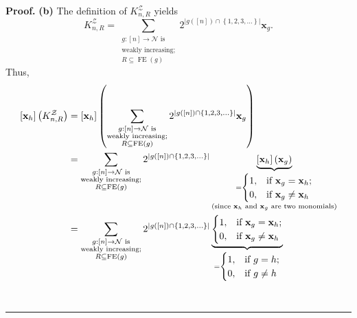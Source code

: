 \documentclass[numbers=enddot,12pt,final,onecolumn,notitlepage]{scrartcl}%
\theoremstyle{definition}
\newenvironment{proof}[1][Proof]{\noindent\textbf{#1.} }{\ \rule{0.5em}{0.5em}}
\let\sumnonlimits\sum
\renewcommand{\sum}{\sumnonlimits\limits}
\begin{document}
\begin{proof}
\textbf{(b)} The definition of $K_{n,R}^{\mathcal{Z}}$ yields%
\[
K_{n,R}^{\mathcal{Z}}=\sum_{\substack{g:\left[  n\right]  \rightarrow
\mathcal{N}\text{ is}\\\text{weakly increasing;}\\R\subseteq\operatorname*{FE}%
\left(  g\right)  }}2^{\left\vert g\left(  \left[  n\right]  \right)
\cap\left\{  1,2,3,\ldots\right\}  \right\vert }\mathbf{x}_{g}.
\]
Thus,%
\begin{align*}
\left[  \mathbf{x}_{h}\right]  \left(  K_{n,R}^{\mathcal{Z}}\right)   &
=\left[  \mathbf{x}_{h}\right]  \left(  \sum_{\substack{g:\left[  n\right]
\rightarrow\mathcal{N}\text{ is}\\\text{weakly increasing;}\\R\subseteq
\operatorname*{FE}\left(  g\right)  }}2^{\left\vert g\left(  \left[  n\right]
\right)  \cap\left\{  1,2,3,\ldots\right\}  \right\vert }\mathbf{x}_{g}\right)
\\
&  =\sum_{\substack{g:\left[  n\right]  \rightarrow\mathcal{N}\text{
is}\\\text{weakly increasing;}\\R\subseteq\operatorname*{FE}\left(  g\right)
}}2^{\left\vert g\left(  \left[  n\right]  \right)  \cap\left\{
1,2,3,\ldots\right\}  \right\vert }\underbrace{\left[  \mathbf{x}_{h}\right]
\left(  \mathbf{x}_{g}\right)  }_{\substack{=%
\begin{cases}
1, & \text{if }\mathbf{x}_{g}=\mathbf{x}_{h};\\
0, & \text{if }\mathbf{x}_{g}\neq\mathbf{x}_{h}%
\end{cases}
\\\text{(since }\mathbf{x}_{h}\text{ and }\mathbf{x}_{g}\text{ are two
monomials)}}}\\
&  =\sum_{\substack{g:\left[  n\right]  \rightarrow\mathcal{N}\text{
is}\\\text{weakly increasing;}\\R\subseteq\operatorname*{FE}\left(  g\right)
}}2^{\left\vert g\left(  \left[  n\right]  \right)  \cap\left\{
1,2,3,\ldots\right\}  \right\vert }\underbrace{%
\begin{cases}
1, & \text{if }\mathbf{x}_{g}=\mathbf{x}_{h};\\
0, & \text{if }\mathbf{x}_{g}\neq\mathbf{x}_{h}%
\end{cases}
}_{\substack{=%
\begin{cases}
1, & \text{if }g=h;\\
0, & \text{if }g\neq h
\end{cases}
}}
\end{align*}
\end{proof}
\end{document}
